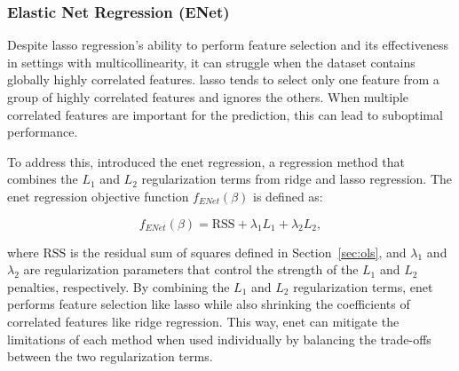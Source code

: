 \subsubsection{Elastic Net Regression (ENet)}
Despite \gls{lasso} regression's ability to perform feature selection and its effectiveness in settings with multicollinearity, it can struggle when the dataset contains globally highly correlated features.
\gls{lasso} tends to select only one feature from a group of highly correlated features and ignores the others\cite{zou_regularization_2005}.
When multiple correlated features are important for the prediction, this can lead to suboptimal performance.

To address this, \citet{zou_regularization_2005} introduced the \gls{enet} regression, a regression method that combines the $L_1$ and $L_2$ regularization terms from ridge and \gls{lasso} regression.
The \gls{enet} regression objective function $f_{ENet}(\beta)$ is defined as:

$$
f_{ENet}(\beta) = \text{RSS} + \lambda_1 L_1 + \lambda_2 L_2,
$$

where $\text{RSS}$ is the residual sum of squares defined in Section~\ref{sec:ols}, and $\lambda_1$ and $\lambda_2$ are regularization parameters that control the strength of the $L_1$ and $L_2$ penalties, respectively.
By combining the $L_1$ and $L_2$ regularization terms, \gls{enet} performs feature selection like \gls{lasso} while also shrinking the coefficients of correlated features like ridge regression.
This way, \gls{enet} can mitigate the limitations of each method when used individually by balancing the trade-offs between the two regularization terms.